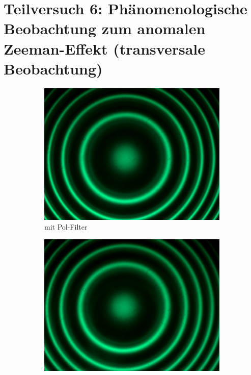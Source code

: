 \newpage
\section{Teilversuch 6: Phänomenologische Beobachtung zum anomalen Zeeman-Effekt (transversale Beobachtung)}
	\begin{figure}[!ht]
	    \centering
	   	\begin{subfigure}{0.48\textwidth}
			\centering
			\includegraphics[width=\textwidth]{images/Capture_822.bmp.jpg}
			\caption{mit Pol-Filter}
			\vspace{0.5\baselineskip}
		\end{subfigure}
		\hfill
		\begin{subfigure}{0.48\textwidth}
			\centering
			\includegraphics[width=\textwidth]{images/Capture_824.bmp.jpg}

\end{subfigure}
\end{figure}
